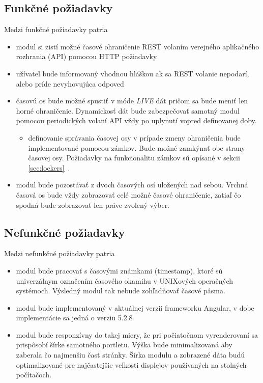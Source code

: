 \documentclass[
  digital, %
  twoside, %
  notable,   %
  nolof,   %
  nolot,   %
]{fithesis3}
\begin{document}
\subsection{Funkčné požiadavky}
Medzi funkčné požiadavky patria
\begin{itemize}
\item modul si zistí možné časové ohraničenie REST volaním verejného aplikačného rozhrania (API) pomocou HTTP požiadavky
\item užívateľ bude informovaný vhodnou hláškou ak sa REST volanie nepodarí, alebo príde nevyhovujúca odpoveď
\item časovú os bude možné spustiť v móde \textit{LIVE} dát pričom sa bude meniť len horné ohraničenie. Dynamickosť dát bude zabezpečovať samotný modul pomocou periodických volaní API vždy po uplynutí vopred definovanej doby.
\begin{itemize}
\item definovanie správania časovej osy v prípade zmeny ohraničenia bude implementované pomocou zámkov. Bude možné zamkýnať obe strany časovej osy. Požiadavky na funkcionalitu zámkov sú opísané v sekcii \ref{sec:lockers}~.
\end{itemize}
\item modul bude pozostávať z dvoch časových osí uložených nad sebou. Vrchná časová os bude vždy zobrazovať celé možné časové ohraničenie, zatiaľ čo spodná bude zobrazovať len práve zvolený výber.
\end{itemize}

\subsection{Nefunkčné požiadavky}
Medzi nefunkčné požiadavky patria
\begin{itemize}
\item modul bude pracovať s časovými známkami (timestamp), ktoré sú univerzálnym označením časového okamihu v UNIXových operačných systémoch. Výsledný modul tak nebude zohľadňovať časové pásma.
\item modul bude implementovaný v aktuálnej verzii frameworku Angular, v dobe implementácie sa jedná o verziu 5.2.8
\item modul bude responzívny do takej miery, že pri počiatočnom vyrenderovaní sa prispôsobí šírke samotného portletu. Výška bude minimalizovaná aby zaberala čo najmenšiu časť stránky. Šírka modulu a zobrazené dáta budú optimalizované pre najčastejšie veľkosti displejov používaných na stolných počítačoch.
\end{itemize}
\end{document}
